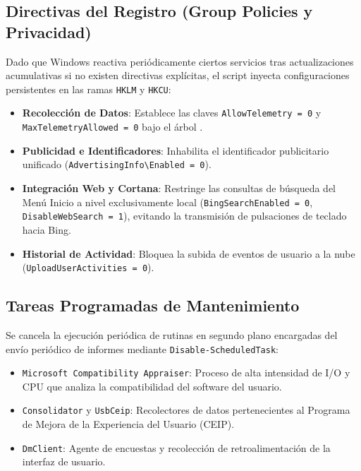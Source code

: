 \documentclass[12pt,a4paper]{report}
\begin{document}
\subsection{Directivas del Registro (Group Policies y Privacidad)}
Dado que Windows reactiva periódicamente ciertos servicios tras actualizaciones acumulativas si no existen directivas explícitas, el script inyecta configuraciones persistentes en las ramas \texttt{HKLM} y \texttt{HKCU}:
\begin{itemize}
    \item \textbf{Recolección de Datos}: Establece las claves \texttt{AllowTelemetry = 0} y \texttt{MaxTelemetryAllowed = 0} bajo el árbol .
    \item \textbf{Publicidad e Identificadores}: Inhabilita el identificador publicitario unificado (\texttt{AdvertisingInfo\textbackslash Enabled = 0}).
    \item \textbf{Integración Web y Cortana}: Restringe las consultas de búsqueda del Menú Inicio a nivel exclusivamente local (\texttt{BingSearchEnabled = 0}, \texttt{DisableWebSearch = 1}), evitando la transmisión de pulsaciones de teclado hacia Bing.
    \item \textbf{Historial de Actividad}: Bloquea la subida de eventos de usuario a la nube (\texttt{UploadUserActivities = 0}).
\end{itemize}

\subsection{Tareas Programadas de Mantenimiento}
Se cancela la ejecución periódica de rutinas en segundo plano encargadas del envío periódico de informes mediante \texttt{Disable-ScheduledTask}:
\begin{itemize}
    \item \texttt{Microsoft Compatibility Appraiser}: Proceso de alta intensidad de I/O y CPU que analiza la compatibilidad del software del usuario.
    \item \texttt{Consolidator} y \texttt{UsbCeip}: Recolectores de datos pertenecientes al Programa de Mejora de la Experiencia del Usuario (CEIP).
    \item \texttt{DmClient}: Agente de encuestas y recolección de retroalimentación de la interfaz de usuario.
\end{itemize}
\end{document}
